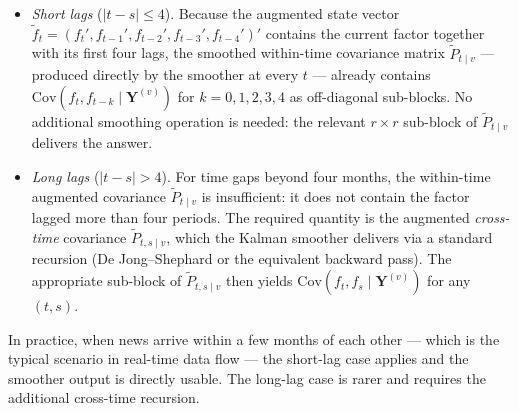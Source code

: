 \documentclass[11pt, a4paper, oneside]{article}
\begin{document}
\begin{itemize}[leftmargin=1.5em, itemsep=3pt]
    \item \emph{Short lags} ($|t - s| \leq 4$). Because the
          augmented state vector
          $\tilde{f}_t = (f_t', f_{t-1}', f_{t-2}', f_{t-3}', f_{t-4}')'$
          contains the current factor together with its first four
          lags, the smoothed within-time covariance matrix
          $\tilde{P}_{t \mid v}$ — produced directly by the smoother
          at every $t$ — already contains
          $\mathrm{Cov}(f_t, f_{t-k} \mid \mathbf{Y}^{(v)})$ for
          $k = 0, 1, 2, 3, 4$ as off-diagonal sub-blocks. No
          additional smoothing operation is needed: the relevant
          $r \times r$ sub-block of $\tilde{P}_{t \mid v}$
          delivers the answer.
    \item \emph{Long lags} ($|t - s| > 4$). For time gaps beyond
          four months, the within-time augmented covariance
          $\tilde{P}_{t \mid v}$ is insufficient: it does not
          contain the factor lagged more than four periods. The
          required quantity is the augmented \emph{cross-time}
          covariance $\tilde{P}_{t, s \mid v}$, which the Kalman
          smoother delivers via a standard recursion
          (De Jong--Shephard or the equivalent backward pass). The
          appropriate sub-block of $\tilde{P}_{t, s \mid v}$ then
          yields $\mathrm{Cov}(f_t, f_s \mid \mathbf{Y}^{(v)})$ for
          any $(t, s)$.
\end{itemize}

In practice, when news arrive within a few months of each other —
which is the typical scenario in real-time data flow — the short-lag
case applies and the smoother output is directly usable. The
long-lag case is rarer and requires the additional cross-time
recursion.
\end{document}
